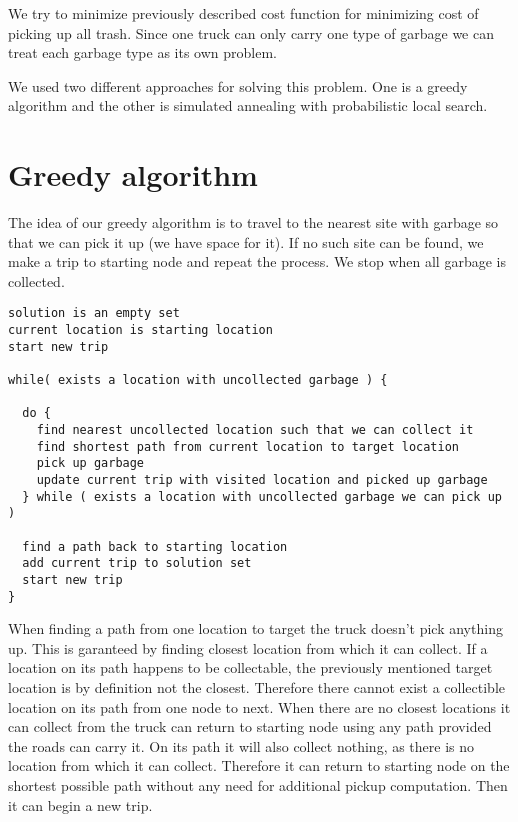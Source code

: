 \documentclass[a4paper, 12pt]{article}
\begin{document}
We try to minimize previously described cost function for minimizing cost of
picking up all trash. Since one truck can only carry one type of garbage we
can treat each garbage type as its own problem.

We used two different approaches for solving this problem. One is a greedy
algorithm and the other is simulated annealing with probabilistic local search.

\section{Greedy algorithm}

The idea of our greedy algorithm is to travel to the nearest site with garbage
so that we can pick it up (we have space for it). If no such site can be found,
we make a trip to starting node and repeat the process. We stop when all
garbage is collected.

\begin{lstlisting}[basicstyle=\small]
solution is an empty set
current location is starting location
start new trip

while( exists a location with uncollected garbage ) {

  do {
    find nearest uncollected location such that we can collect it
    find shortest path from current location to target location
    pick up garbage
    update current trip with visited location and picked up garbage
  } while ( exists a location with uncollected garbage we can pick up )

  find a path back to starting location
  add current trip to solution set
  start new trip
}
\end{lstlisting}

When finding a path from one location to target the truck doesn't pick anything
up. This is garanteed by finding closest location from which it can collect. If
a location on its path happens to be collectable, the previously mentioned
target location is by definition not the closest. Therefore there cannot exist
a collectible location on its path from one node to next. When there are no
closest locations it can collect from the truck can return to starting node
using any path provided the roads can carry it. On its path it will also
collect nothing, as there is no location from which it can collect. Therefore
it can return to starting node on the shortest possible path without any need
for additional pickup computation. Then it can begin a new trip.
\end{document}
